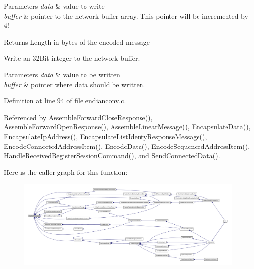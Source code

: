 \begin{DoxyParams}{\-Parameters}
{\em data} & value to write \\
\hline
{\em buffer} & pointer to the network buffer array. \-This pointer will be incremented by 4!\\
\hline
\end{DoxyParams}
\begin{DoxyReturn}{\-Returns}
\-Length in bytes of the encoded message
\end{DoxyReturn}
\-Write an 32\-Bit integer to the network buffer.


\begin{DoxyParams}{\-Parameters}
{\em data} & value to be written \\
\hline
{\em buffer} & pointer where data should be written. \\
\hline
\end{DoxyParams}


\-Definition at line 94 of file endianconv.\-c.



\-Referenced by \-Assemble\-Forward\-Close\-Response(), \-Assemble\-Forward\-Open\-Response(), \-Assemble\-Linear\-Message(), \-Encapsulate\-Data(), \-Encapsulate\-Ip\-Address(), \-Encapsulate\-List\-Identy\-Response\-Message(), \-Encode\-Connected\-Address\-Item(), \-Encode\-Data(), \-Encode\-Sequenced\-Address\-Item(), \-Handle\-Received\-Register\-Session\-Command(), and \-Send\-Connected\-Data().



\-Here is the caller graph for this function\-:
\nopagebreak
\begin{figure}[H]
\begin{center}
\leavevmode
\includegraphics[width=350pt]{d4/d91/group__ENCAP_gaafc3c9e3ff582c9b7e438ae2b1fdf822_icgraph}
\end{center}
\end{figure}


